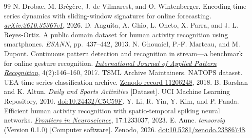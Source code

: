 \begin{thebibliography}{99}
 N. Drobac, M. Br\'eg\`ere, J. de Vilmarest, and O. Wintenberger. Encoding time series dynamics with sliding-window signatures for online forecasting. \href{https://arxiv.org/abs/2610.35367v1}{\emph{arXiv:2610.35367v1}}, 2026.
 D. Anguita, A. Ghio, L. Oneto, X. Parra, and J. L. Reyes-Ortiz. A public domain dataset for human activity recognition using smartphones. \emph{ESANN}, pp.~437--442, 2013.
 N. Ghouaiel, P.-F. Marteau, and M. Dupont. Continuous pattern detection and recognition in stream---a benchmark for online gesture recognition. \href{https://doi.org/10.1504/IJAPR.2017.085315}{\emph{International Journal of Applied Pattern Recognition}}, 4(2):146--160, 2017.
 TSML Archive Maintainers. NATOPS dataset. UEA time series classification archive. \href{https://doi.org/10.5281/zenodo.11206248}{Zenodo record 11206248}, 2018.
 B. Barshan and K. Altun. \emph{Daily and Sports Activities} [Dataset]. UCI Machine Learning Repository, 2010. \href{https://doi.org/10.24432/C5C59F}{doi:10.24432/C5C59F}.
 Y. Li, R. Yin, Y. Kim, and P. Panda. Efficient human activity recognition with spatio-temporal spiking neural networks. \href{https://doi.org/10.3389/fnins.2023.1233037}{\emph{Frontiers in Neuroscience}}, 17:1233037, 2023.
 E. Aune. \emph{tensorsig} (Version 0.1.0) [Computer software]. Zenodo, 2026. \href{https://doi.org/10.5281/zenodo.23886748}{doi:10.5281/zenodo.23886748}.
\end{thebibliography}
